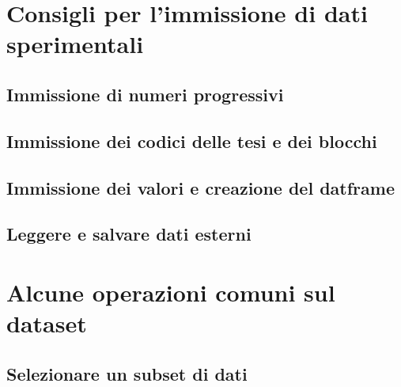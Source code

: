 \documentclass[a4paper,12pt,oneside]{book}
\begin{document}
\hypertarget{consigli-per-limmissione-di-dati-sperimentali}{%
\section*{Consigli per l'immissione di dati sperimentali}\label{consigli-per-limmissione-di-dati-sperimentali}}

\hypertarget{immissione-di-numeri-progressivi}{%
\subsection*{Immissione di numeri progressivi}\label{immissione-di-numeri-progressivi}}

\hypertarget{immissione-dei-codici-delle-tesi-e-dei-blocchi}{%
\subsection*{Immissione dei codici delle tesi e dei blocchi}\label{immissione-dei-codici-delle-tesi-e-dei-blocchi}}

\hypertarget{immissione-dei-valori-e-creazione-del-datframe}{%
\subsection*{Immissione dei valori e creazione del datframe}\label{immissione-dei-valori-e-creazione-del-datframe}}

\hypertarget{leggere-e-salvare-dati-esterni}{%
\subsection*{Leggere e salvare dati esterni}\label{leggere-e-salvare-dati-esterni}}

\hypertarget{alcune-operazioni-comuni-sul-dataset}{%
\section*{Alcune operazioni comuni sul dataset}\label{alcune-operazioni-comuni-sul-dataset}}

\hypertarget{selezionare-un-subset-di-dati}{%
\subsection*{Selezionare un subset di dati}\label{selezionare-un-subset-di-dati}}
\end{document}
